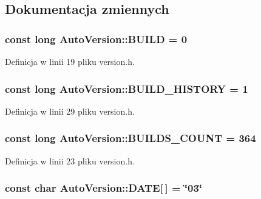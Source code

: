 \subsection{Dokumentacja zmiennych}
\hypertarget{a00019_611dbb96b2f949b29627d8d714396911}{
\subsubsection[{BUILD}]{\setlength{\rightskip}{0pt plus 5cm}const long {\bf AutoVersion::BUILD} = 0}}
\label{dd/da2/a00019_611dbb96b2f949b29627d8d714396911}




Definicja w linii 19 pliku version.h.\hypertarget{a00019_cc483b25abe55f62bcf02496baf549dc}{
\subsubsection[{BUILD\_\-HISTORY}]{\setlength{\rightskip}{0pt plus 5cm}const long {\bf AutoVersion::BUILD\_\-HISTORY} = 1}}
\label{dd/da2/a00019_cc483b25abe55f62bcf02496baf549dc}




Definicja w linii 29 pliku version.h.\hypertarget{a00019_03e819549a8f22b45aacef6ac27de284}{
\subsubsection[{BUILDS\_\-COUNT}]{\setlength{\rightskip}{0pt plus 5cm}const long {\bf AutoVersion::BUILDS\_\-COUNT} = 364}}
\label{dd/da2/a00019_03e819549a8f22b45aacef6ac27de284}




Definicja w linii 23 pliku version.h.\hypertarget{a00019_76114a4076f4ae162ea5de4f97d1a597}{
\subsubsection[{DATE}]{\setlength{\rightskip}{0pt plus 5cm}const char {\bf AutoVersion::DATE}\mbox{[}$\,$\mbox{]} = \char`\"{}03\char`\"{}}}
\label{dd/da2/a00019_76114a4076f4ae162ea5de4f97d1a597}




